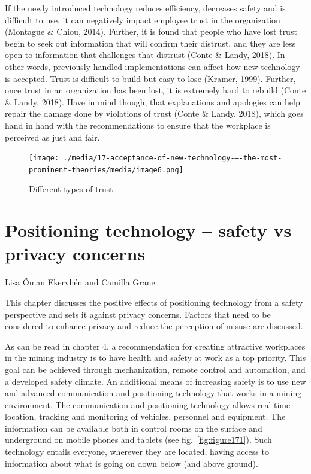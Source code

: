 \documentclass[
  12pt,
]{scrbook}
\newenvironment{chap-auth}
{\vspace{1cm}\begin{center}\begin{flushright}\sffamily\noindent}
  {\end{flushright}\end{center}\vspace{1cm}}
\begin{document}
If the newly introduced technology reduces efficiency, decreases safety and is difficult to use, it can negatively impact employee trust in the organization (Montague \& Chiou, 2014). Further, it is found that people who have lost trust begin to seek out information that will confirm their distrust, and they are less open to information that challenges that distrust (Conte \& Landy, 2018). In other words, previously handled implementations can affect how new technology is accepted. Trust is difficult to build but easy to lose (Kramer, 1999). Further, once trust in an organization has been lost, it is extremely hard to rebuild (Conte \& Landy, 2018). Have in mind though, that explanations and apologies can help repair the damage done by violations of trust (Conte \& Landy, 2018), which goes hand in hand with the recommendations to ensure that the workplace is perceived as just and fair.~

\begin{figure}
\hypertarget{fig:figure166}{%
\centering
\texttt{[image: ./media/17-acceptance-of-new-technology-–-the-most-prominent-theories/media/image6.png]}
\caption[Different types of trust]{Different types of trust\footnotemark{}}\label{fig:figure166}
}
\end{figure}

\hypertarget{positioning-technology-safety-vs-privacy-concerns}{%
\chapter{Positioning technology -- safety vs privacy concerns}\label{positioning-technology-safety-vs-privacy-concerns}}

\begin{chap-auth}
Lisa Öman Ekervhén and Camilla Grane
\end{chap-auth}

This chapter discusses the positive effects of positioning technology from a safety perspective and sets it against privacy concerns. Factors that need to be considered to enhance privacy and reduce the perception of misuse are discussed.

As can be read in chapter 4, a recommendation for creating attractive workplaces in the mining industry is to have health and safety at work as a top priority. This goal can be achieved through mechanization, remote control and automation, and a developed safety climate. An additional means of increasing safety is to use new and advanced communication and positioning technology that works in a mining environment. The communication and positioning technology allows real-time location, tracking and monitoring of vehicles, personnel and equipment. The information can be available both in control rooms on the surface and underground on mobile phones and tablets (see fig.~\ref{fig:figure171}). Such technology entails everyone, wherever they are located, having access to information about what is going on down below (and above ground).~
\end{document}
